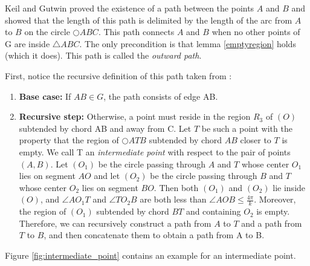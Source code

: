 Keil and Gutwin \cite{keil} proved the existence of a path between the points $A $ and $B $ and showed that the length of this path is delimited by the length of the arc from $A $ to $B $ on the circle $\bigcirc{ABC} $.
This path connects $A $ and $B $ when no other points of G are inside $\triangle{ABC} $.
The only precondition is that lemma \ref{emptyregion} holds (which it does).
This path is called the \emph{outward path}.
 
First, notice the recursive definition of this path taken from \cite{kanj}:
\begin{enumerate}
\item \textbf{Base case:} If $AB \in G $, the path consists of edge AB.
\item \textbf{Recursive step:} Otherwise, a point must reside in the region $R_3 $ of $(O) $ subtended by chord AB and away from C. 
Let $T $ be such a point with the property that the region of $\bigcirc{ATB} $ subtended by chord $AB $ closer to $T $ is empty. 
We call T an \emph{intermediate point} with respect to the pair of points $(A, B) $.
Let $(O_1) $ be the circle passing through $A $ and $T $ whose center $O_1 $ lies on segment $AO $  and let $(O_2) $ be the circle passing through $B $ and $T $ whose center $O_2 $ lies on segment $BO $.
Then both $(O_1) $ and $(O_2) $ lie inside $(O) $, and $\angle{AO_1T} $ and $\angle{TO_2B} $ are both less than $\angle{AOB} \leq \frac{4\pi}{k} $.
Moreover, the region of $(O_1) $ subtended by chord $BT $ and containing $O_2 $ is empty. Therefore, we can recursively construct a path from $A $ to $T $ and a path from $T $ to $B $, and then concatenate them to obtain a path from A to B.  
\end{enumerate}
Figure \ref{fig:intermediate_point} contains an example for an intermediate point.

